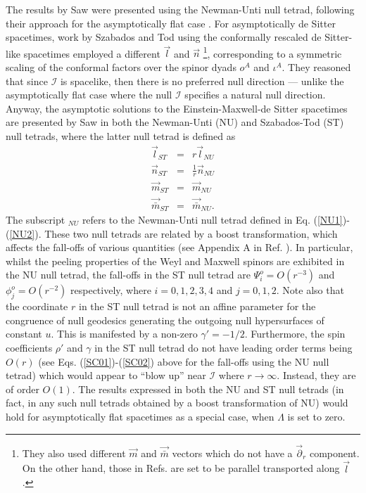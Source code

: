 \documentclass[aps,pre,preprint,superscriptaddress,showpacs,showkeys]{revtex4-1}
\begin{document}
The results by Saw were presented using the Newman-Unti null tetrad, following their approach for the asymptotically flat case \cite{newunti62}. For asymptotically de Sitter spacetimes, work by Szabados and Tod \cite{Szabados} using the conformally rescaled de Sitter-like spacetimes employed a different $\vec{l}$ and $\vec{n}$ \footnote{They also used different $\vec{m}$ and $\vec{\bar{m}}$ vectors which do not have a $\vec{\partial}_r$ component. On the other hand, those in Refs. \cite{newunti62,Vee2016} are set to be parallel transported along $\vec{l}$.}, corresponding to a symmetric scaling of the conformal factors over the spinor dyads $o^A$ and $\iota^A$. They reasoned that since $\mathcal{I}$ is spacelike, then there is no preferred null direction --- unlike the asymptotically flat case where the null $\mathcal{I}$ specifies a natural null direction. Anyway, the asymptotic solutions to the Einstein-Maxwell-de Sitter spacetimes are presented by Saw \cite{Vee2017} in both the Newman-Unti (NU) and Szabados-Tod (ST) null tetrads, where the latter null tetrad is defined as
\begin{eqnarray}
\vec{l}_{ST}&=&r\vec{l}_{NU}\\
\vec{n}_{ST}&=&\frac{1}{r}\vec{n}_{NU}\\
\vec{m}_{ST}&=&\vec{m}_{NU}\\
\vec{\bar{m}}_{ST}&=&\vec{\bar{m}}_{NU}.
\end{eqnarray}
The subscript $_{NU}$ refers to the Newman-Unti null tetrad defined in Eq. (\ref{NU1})-(\ref{NU2}). These two null tetrads are related by a boost transformation, which affects the fall-offs of various quantities (see Appendix A in Ref. \cite{Vee2017}). In particular, whilst the peeling properties of the Weyl and Maxwell spinors are exhibited in the NU null tetrad, the fall-offs in the ST null tetrad are $\Psi^o_{i}=O(r^{-3})$ and $\phi^o_j=O(r^{-2})$ respectively, where $i=0,1,2,3,4$ and $j=0,1,2$. Note also that the coordinate $r$ in the ST null tetrad is not an affine parameter for the congruence of null geodesics generating the outgoing null hypersurfaces of constant $u$. This is manifested by a non-zero $\gamma'=-1/2$. Furthermore, the spin coefficients $\rho'$ and $\gamma$ in the ST null tetrad do not have leading order terms being $O(r)$ (see Eqs. (\ref{SC01})-(\ref{SC02}) above for the fall-offs using the NU null tetrad) which would appear to ``blow up'' near $\mathcal{I}$ where $r\rightarrow\infty$. Instead, they are of order $O(1)$. The results expressed in both the NU and ST null tetrads (in fact, in any such null tetrads obtained by a boost transformation of NU) would hold for asymptotically flat spacetimes as a special case, when $\Lambda$ is set to zero.
\end{document}
